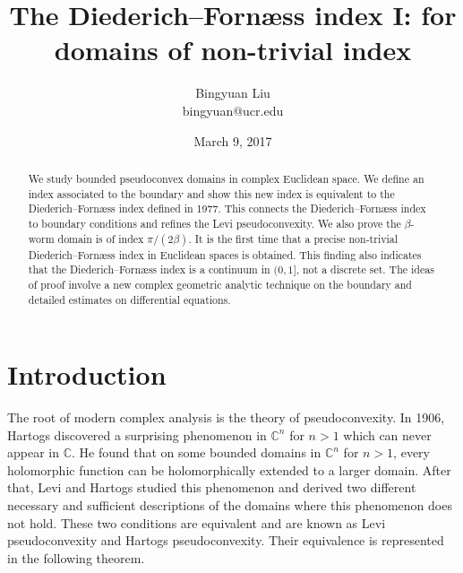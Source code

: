 \documentclass[11pt]{article}
\theoremstyle{plain} \numberwithin{equation}{section}
\theoremstyle{definition}
\begin{document}
	
	\title{The Diederich--Forn\ae ss index I: for domains of non-trivial index}
	
	
	\author{
		Bingyuan Liu\\ bingyuan@ucr.edu
	}
	
	\date{March 9, 2017}
	
	
	
	\maketitle
	
	\begin{abstract}
We study bounded pseudoconvex domains in complex Euclidean space. We define an index associated to the boundary and show this new index is equivalent to the Diederich--Forn\ae ss index defined in 1977. This connects the Diederich--Forn\ae ss index to boundary conditions and refines the Levi pseudoconvexity. We also prove the $\beta$-worm domain is of index $\pi/{(2\beta)}$. It is the first time that a precise non-trivial Diederich--Forn\ae ss index in Euclidean spaces is obtained. This finding also indicates that the Diederich--Forn\ae ss index is a continuum in $(0,1]$, not a discrete set. The ideas of proof involve a new complex geometric analytic technique on the boundary and detailed estimates on differential equations.
	\end{abstract}
	
	\section{Introduction}\label{sec0}	
	The root of modern complex analysis is the theory of pseudoconvexity. In 1906, Hartogs discovered a surprising phenomenon in $\mathbb{C}^n$ for $n>1$ which can never appear in $\mathbb{C}$. He found that on some bounded domains in $\mathbb{C}^n$ for $n>1$, every holomorphic function can be holomorphically extended to a larger domain. After that, Levi and Hartogs studied this phenomenon and derived two different necessary and sufficient descriptions of the domains where this phenomenon does not hold. These two conditions are equivalent and are known as Levi pseudoconvexity and Hartogs pseudoconvexity. Their equivalence is represented in the following theorem.
	
\end{document}
